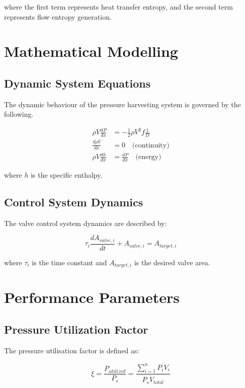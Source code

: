 \documentclass[12pt,a4paper]{article}
\begin{document}
where the first term represents heat transfer entropy, and the second term represents flow entropy generation.

\section{Mathematical Modelling}

\subsection{Dynamic System Equations}

The dynamic behaviour of the pressure harvesting system is governed by the following.

\begin{align}
\rho V \frac{dP}{dx} &= -\frac{1}{2}\rho V^2 f \frac{1}{D} \\
\frac{d\rho V}{dx} &= 0 \quad \text{(continuity)} \\
\rho V \frac{dh}{dx} &= \frac{dP}{dx} \quad \text{(energy)}
\end{align}

where $h$ is the specific enthalpy.

\subsection{Control System Dynamics}

The valve control system dynamics are described by:

\begin{equation}
\tau_i \frac{dA_{valve,i}}{dt} + A_{valve,i} = A_{target,i}
\end{equation}

where $\tau_i$ is the time constant and $A_{target,i}$ is the desired valve area.

\section{Performance Parameters}

\subsection{Pressure Utilization Factor}

The pressure utilisation factor is defined as:

\begin{equation}
\xi = \frac{P_{utilized}}{P_s} = \frac{\sum_{i=1}^{n} P_i \dot{V}_i}{P_s \dot{V}_{total}}
\end{equation}
\end{document}
